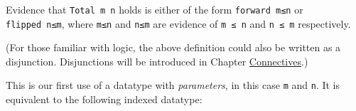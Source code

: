 \begin{fence}
\begin{code}%
\>[0]\AgdaSpace{}%
\AgdaSpace{}%
\AgdaSymbol{(}\AgdaSpace{}%
\AgdaSpace{}%
\AgdaSymbol{:}\AgdaSpace{}%
\AgdaSymbol{)}\AgdaSpace{}%
\AgdaSymbol{:}\AgdaSpace{}%
\AgdaSpace{}%
\<%
\\
%
\\[\AgdaEmptyExtraSkip]%
\>[0][@{}l@{\AgdaIndent{0}}]%
\>[2]\AgdaSpace{}%
\AgdaSymbol{:}\<%
\\
\>[2][@{}l@{\AgdaIndent{0}}]%
\>[6]\AgdaSpace{}%
\AgdaSpace{}%
\<%
\\
%
\>[6]\AgdaComment{---------}\<%
\\
\>[2][@{}l@{\AgdaIndent{0}}]%
\>[4]\AgdaSpace{}%
\AgdaSpace{}%
\AgdaSpace{}%
\<%
\\
%
\\[\AgdaEmptyExtraSkip]%
%
\>[2]\AgdaSpace{}%
\AgdaSymbol{:}\<%
\\
\>[2][@{}l@{\AgdaIndent{0}}]%
\>[6]\AgdaSpace{}%
\AgdaSpace{}%
\<%
\\
%
\>[6]\AgdaComment{---------}\<%
\\
\>[2][@{}l@{\AgdaIndent{0}}]%
\>[4]\AgdaSpace{}%
\AgdaSpace{}%
\AgdaSpace{}%
\<%
\end{code}
\end{fence}

Evidence that \texttt{Total\ m\ n} holds is either of the form
\texttt{forward\ m≤n} or \texttt{flipped\ n≤m}, where \texttt{m≤n} and
\texttt{n≤m} are evidence of \texttt{m\ ≤\ n} and \texttt{n\ ≤\ m}
respectively.

(For those familiar with logic, the above definition could also be
written as a disjunction. Disjunctions will be introduced in Chapter
\protect\hyperlink{Connectives}{Connectives}.)

This is our first use of a datatype with \emph{parameters}, in this case
\texttt{m} and \texttt{n}. It is equivalent to the following indexed
datatype:

